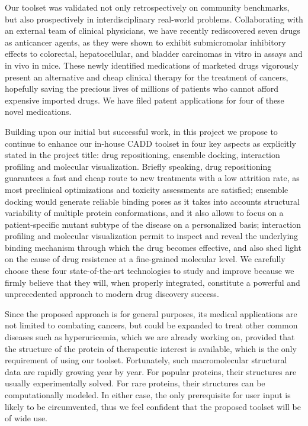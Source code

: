 \documentclass[a4paper,12pt]{article}
\begin{document}
Our toolset was validated not only retrospectively on community benchmarks, but also prospectively in interdisciplinary real-world problems. Collaborating with an external team of clinical physicians, we have recently rediscovered seven drugs as anticancer agents, as they were shown to exhibit submicromolar inhibitory effects to colorectal, hepatocellular, and bladder carcinomas in vitro in assays and in vivo in mice. These newly identified medications of marketed drugs vigorously present an alternative and cheap clinical therapy for the treatment of cancers, hopefully saving the precious lives of millions of patients who cannot afford expensive imported drugs. We have filed patent applications for four of these novel medications.

Building upon our initial but successful work, in this project we propose to continue to enhance our in-house CADD toolset in four key aspects as explicitly stated in the project title: drug repositioning, ensemble docking, interaction profiling and molecular visualization. Briefly speaking, drug repositioning guarantees a fast and cheap route to new treatments with a low attrition rate, as most preclinical optimizations and toxicity assessments are satisfied; ensemble docking would generate reliable binding poses as it takes into accounts structural variability of multiple protein conformations, and it also allows to focus on a patient-specific mutant subtype of the disease on a personalized basis; interaction profiling and molecular visualization permit to inspect and reveal the underlying binding mechanism through which the drug becomes effective, and also shed light on the cause of drug resistence at a fine-grained molecular level. We carefully choose these four state-of-the-art technologies to study and improve because we firmly believe that they will, when properly integrated, constitute a powerful and unprecedented approach to modern drug discovery success.

Since the proposed approach is for general purposes, its medical applications are not limited to combating cancers, but could be expanded to treat other common diseases such as hyperuricemia, which we are already working on, provided that the structure of the protein of therapeutic interest is available, which is the only requirement of using our toolset. Fortunately, such macromolecular structural data are rapidly growing year by year. For popular proteins, their structures are usually experimentally solved. For rare proteins, their structures can be computationally modeled. In either case, the only prerequisite for user input is likely to be circumvented, thus we feel confident that the proposed toolset will be of wide use.
\end{document}
